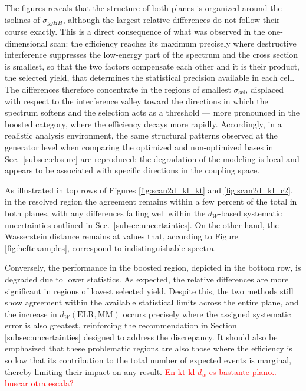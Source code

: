 %
The figures reveals that the structure of both planes is organized around the isolines of $\sigma_{ggHH}$, although the largest relative differences do not follow their course exactly. This is a direct consequence of what was observed in the one-dimensional scan: the efficiency reaches its maximum precisely where destructive interference suppresses the low-energy part of the spectrum and the cross section is smallest, so that the two factors compensate each other and it is their product, the selected yield, that determines the statistical precision available in each cell. The differences therefore concentrate in the regions of smallest $\sigma_\text{sel}$, displaced with respect to the interference valley toward the directions in which the spectrum softens and the selection acts as a threshold — more pronounced in the boosted category, where the efficiency decays more rapidly. Accordingly, in a realistic analysis environment, the same structural patterns observed at the generator level when comparing the optimized and non-optimized bases in Sec.~\ref{subsec:closure} are reproduced: the degradation of the modeling is local and appears to be associated with specific directions in the coupling space.

As illustrated in top rows of Figures \ref{fig:scan2d_kl_kt} and \ref{fig:scan2d_kl_c2}, in the resolved region the agreement remains within a few percent of the total in both planes, with any differences falling well within the $d_W$-based systematic uncertainties outlined in Sec.~\ref{subsec:uncertainties}. On the other hand, the Wasserstein distance remains at values that, according to Figure \ref{fig:heftexamples}, correspond to indistinguishable spectra.

Conversely, the performance in the boosted region, depicted in the bottom row, is degraded due to lower statistics. As expected, the relative differences are more significant in regions of lowest selected yield. Despite this, the two methods still show agreement within the available statistical limits across the entire plane, and the increase in $d_W(\text{ELR},\text{MM})$ occurs precisely where the assigned systematic error is also greatest, reinforcing the recommendation in Section \ref{subsec:uncertainties} designed to address the discrepancy. It should also be emphasized that these problematic regions are also those where the efficiency is so low that its contribution to the total number of expected events is marginal, thereby limiting their impact on any result. \textcolor{red}{En kt-kl $d_w$ es bastante plano.. buscar otra escala?}

